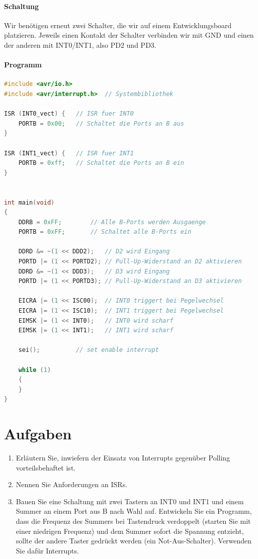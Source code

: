 \documentclass[11pt,a4paper]{scrartcl}
\begin{document}
\paragraph{Schaltung}
Wir benötigen erneut zwei Schalter, die wir auf einem Entwicklungsboard platzieren. Jeweils einen Kontakt der Schalter verbinden wir mit GND und einen der anderen mit INT0/INT1, also PD2 und PD3.
\paragraph{Programm}\quad
\begin{lstlisting}[language=C]
#include <avr/io.h>
#include <avr/interrupt.h>	// Systembibliothek

ISR (INT0_vect) {	// ISR fuer INT0
	PORTB = 0x00;	// Schaltet die Ports an B aus
}			

ISR (INT1_vect) {	// ISR fuer INT1
	PORTB = 0xff;	// Schaltet die Ports an B ein
}


int main(void)
{
	DDRB = 0xFF;		// Alle B-Ports werden Ausgaenge
	PORTB = 0xFF;		// Schaltet alle B-Ports ein 
	
	DDRD &= ~(1 << DDD2); 	// D2 wird Eingang
	PORTD |= (1 << PORTD2);	// Pull-Up-Widerstand an D2 aktivieren
	DDRD &= ~(1 << DDD3);	// D3 wird Eingang
	PORTD |= (1 << PORTD3);	// Pull-Up-Widerstand an D3 aktivieren
	
	EICRA |= (1 << ISC00);	// INT0 triggert bei Pegelwechsel
	EICRA |= (1 << ISC10);	// INT1 triggert bei Pegelwechsel
	EIMSK |= (1 << INT0);	// INT0 wird scharf
	EIMSK |= (1 << INT1);	// INT1 wird scharf
	
	sei();			// set enable interrupt
	
    while (1) 
    {
    }
}
\end{lstlisting}
\section*{Aufgaben}
\begin{enumerate}
\item Erläutern Sie, inwiefern der Einsatz von Interrupts gegenüber Polling vorteilsbehaftet ist.
\item Nennen Sie Anforderungen an ISRs.
\item Bauen Sie eine Schaltung mit zwei Tastern an INT0 und INT1 und einem Summer an einem Port aus B nach Wahl auf. Entwickeln Sie ein Programm, dass die Frequenz des Summers bei Tastendruck verdoppelt (starten Sie mit einer niedrigen Frequenz) und dem Summer sofort die Spannung entzieht, sollte der andere Taster gedrückt werden (ein Not-Aus-Schalter). Verwenden Sie dafür Interrupts.
\end{enumerate}
\pagebreak
\end{document}

